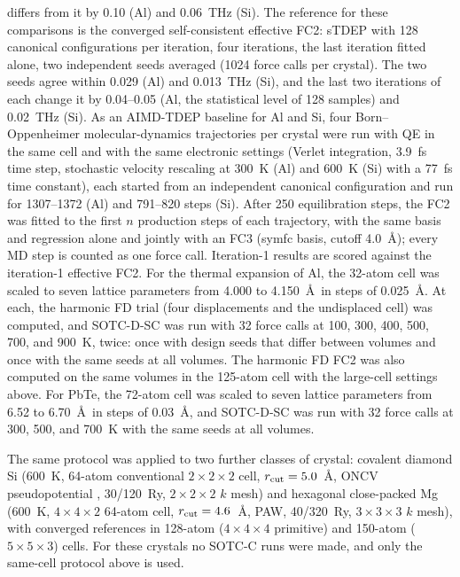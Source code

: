 \documentclass[aip,jap,reprint,amsmath,amssymb,floatfix]{revtex4-2}
\begin{document}
differs from it by 0.10 (Al) and 0.06~THz (Si). The reference for these
comparisons is the converged self-consistent effective FC2: sTDEP with
128 canonical configurations per iteration, four iterations, the last
iteration fitted alone, two independent seeds averaged (1024 force calls per
crystal). The two seeds agree within 0.029 (Al) and 0.013~THz (Si), and the
last two iterations of each change it by 0.04--0.05 (Al, the statistical
level of 128 samples) and 0.02~THz (Si). As an AIMD-TDEP baseline for Al and Si, four Born--Oppenheimer
molecular-dynamics trajectories per crystal were run with QE in the same cell and with the same
electronic settings (Verlet integration, 3.9~fs time step, stochastic velocity
rescaling at 300~K (Al) and 600~K (Si) with a 77~fs time constant), each started from an independent canonical
configuration and run for 1307--1372 (Al) and 791--820 steps (Si). After 250 equilibration steps, the
FC2 was fitted to the first $n$ production steps of each trajectory, with the
same basis and regression alone and jointly with an FC3 (symfc basis, cutoff
4.0~\AA); every MD step is counted as one force call. Iteration-1 results are scored against the iteration-1 effective
FC2. For the thermal expansion of Al, the 32-atom cell was scaled to seven
lattice parameters from 4.000 to 4.150~\AA\ in steps of 0.025~\AA. At each,
the harmonic FD trial (four displacements and the undisplaced cell) was
computed, and SOTC-D-SC was run with 32 force calls at 100, 300, 400, 500,
700, and 900~K, twice: once with design seeds that differ between volumes and
once with the same seeds at all volumes. The harmonic FD FC2 was also computed
on the same volumes in the 125-atom cell with the large-cell settings above.
For PbTe, the 72-atom cell was scaled to seven lattice parameters from 6.52
to 6.70~\AA\ in steps of 0.03~\AA, and SOTC-D-SC was run with 32 force
calls at 300, 500, and 700~K with the same seeds at all volumes.

The same protocol was applied to two further classes of crystal: covalent
diamond Si (600~K, 64-atom conventional $2\times2\times2$ cell, $r_{\rm
cut}=5.0$~\AA, ONCV pseudopotential \cite{ref47}, 30/120~Ry, $2\times2\times2$
$k$ mesh) and hexagonal close-packed Mg (600~K, $4\times4\times2$ 64-atom
cell, $r_{\rm cut}=4.6$~\AA, PAW, 40/320~Ry, $3\times3\times3$ $k$ mesh), with
converged references in 128-atom ($4\times4\times4$ primitive) and 150-atom
($5\times5\times3$) cells. For these crystals no SOTC-C runs were made, and
only the same-cell protocol above is used.
\end{document}
